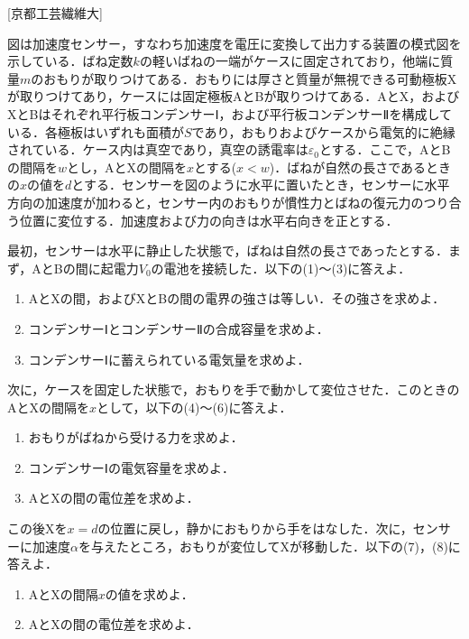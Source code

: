 


\noindent
{} [京都工芸繊維大]

図は加速度センサー，すなわち加速度を電圧に変換して出力する装置の模式図を示している．ばね定数$k$の軽いばねの一端がケースに固定されており，他端に質量$m$のおもりが取りつけてある．おもりには厚さと質量が無視できる可動極板Xが取りつけてあり，ケースには固定極板AとBが取りつけてある．AとX，およびXとBはそれぞれ平行板コンデンサーⅠ，および平行板コンデンサーⅡを構成している．各極板はいずれも面積が$S$であり，おもりおよびケースから電気的に絶縁されている．ケース内は真空であり，真空の誘電率は$\varepsilon_0$とする．ここで，AとBの間隔を$w$とし，AとXの間隔を$x$とする($x < w$)．ばねが自然の長さであるときの$x$の値を$d$とする．センサーを図のように水平に置いたとき，センサーに水平方向の加速度が加わると，センサー内のおもりが慣性力とばねの復元力のつり合う位置に変位する．加速度および力の向きは水平右向きを正とする．

最初，センサーは水平に静止した状態で，ばねは自然の長さであったとする．まず，AとBの間に起電力$V_0$の電池を接続した．以下の(1)〜(3)に答えよ．

\begin{enumerate}[(1)]
  \item AとXの間，およびXとBの間の電界の強さは等しい．その強さを求めよ．
  \item コンデンサーⅠとコンデンサーⅡの合成容量を求めよ．
  \item コンデンサーⅠに蓄えられている電気量を求めよ．
\end{enumerate}

次に，ケースを固定した状態で，おもりを手で動かして変位させた．このときのAとXの間隔を$x$として，以下の(4)〜(6)に答えよ．
\begin{enumerate}[(1), resume]
  \item おもりがばねから受ける力を求めよ．
  \item コンデンサーⅠの電気容量を求めよ．
  \item AとXの間の電位差を求めよ．
\end{enumerate}

この後Xを$x = d$の位置に戻し，静かにおもりから手をはなした．次に，センサーに加速度$\alpha$を与えたところ，おもりが変位してXが移動した．以下の(7)，(8)に答えよ．
\begin{enumerate}[(1), resume]
  \item AとXの間隔$x$の値を求めよ．
  \item AとXの間の電位差を求めよ．
\end{enumerate}

